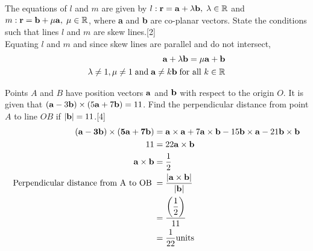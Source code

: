 \documentclass[12pt, a4 paper]{article}
\begin{document}
\begin{outline}[enumerate]
			    
	\color{black}
	\1 The equations of $l$ and $m$ are given by $l:{\bf{r}} = {\bf{a}} + \lambda {\bf{b}},\;\lambda  \in \mathbb{R}$ and $m:{\bf{r}} = {\bf{b}} + \mu {\bf{a}},\;\mu  \in \mathbb{R}$, where \textbf{a} and \textbf{b} are co-planar vectors. State the conditions such that lines $l$ and $m$ are skew lines.\hfill[2]\\
	\color{blue}
	Equating $l$ and $m$ and since skew lines are parallel and do not intersect,
	\begin{align*}
		{\bf{a}} + \lambda {\bf{b}} = \mu {\bf{a}} + {\bf{b}}                                                  \\
		\lambda  \ne 1,\mu  \ne 1\;{\textrm{and}}\;{\bf{a}} \ne k{\bf{b}}\;{\textrm{for all }}k \in \mathbb{R} 
	\end{align*}
							    
							    
	\color{black}
	\1 Points $A$ and $B$ have position vectors $\bf{a}$ and $\bf{b}$ with respect to the origin $O$. It is given that $({\bf{a}} - 3{\bf{b}}) \times (5{\bf{a}} + 7{\bf{b}}) = 11$. Find the perpendicular distance from point $A$ to line $OB$ if $\left| {\bf{b}} \right| = 11$.\hfill[4]
	\color{blue}
	\begin{align*}
		({\bf{a}} - {\bf{3b}}) \times ({\bf{5a}} + {\bf{7b}}) & = {\bf{a}} \times {\bf{a}} + 7{\bf{a}} \times {\bf{b}} - 15{\bf{b}} \times {\bf{a}} - 21{\bf{b}} \times {\bf{b}} \\
		11                                                    & = 22{\bf{a}} \times {\bf{b}}                                                                                     \\
		{\bf{a}} \times {\bf{b}}                              & = \dfrac{1}{2}                                                                                                   \\
		{\textrm{Perpendicular distance from A to OB}}\;      & =\dfrac{{\left| {{\bf{a}} \times {\bf{b}}} \right|}}{{\left| {\bf{b}} \right|}}                                  \\
		                                                      & = \dfrac{{\left( {\dfrac{1}{2}} \right)}}{{11}}                                                                  \\
		                                                      & = \dfrac{1}{{22}}{\textrm{units}}                                                                                
	\end{align*}
							    

\end{outline}
\end{document}
